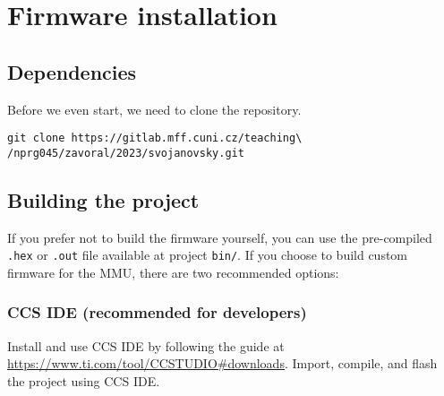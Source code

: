 \chapter{Firmware installation}

\section*{Dependencies}

Before we even start, we need to clone the repository.

\begin{verbatim}
git clone https://gitlab.mff.cuni.cz/teaching\
/nprg045/zavoral/2023/svojanovsky.git
\end{verbatim}

\section{Building the project}
If you prefer not to build the firmware yourself, you can use the pre-compiled \texttt{.hex} or \texttt{.out} file available at project \texttt{bin/}. If you choose to build custom firmware for the MMU, there are two recommended options:

\subsection{CCS IDE (recommended for developers)}

Install and use CCS IDE \cite{ccs} by following the guide at \url{https://www.ti.com/tool/CCSTUDIO#downloads}. Import, compile, and flash the project using CCS IDE.

